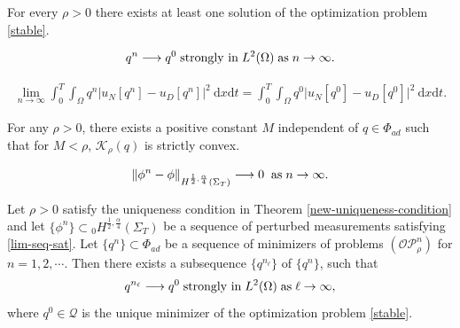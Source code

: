 \documentclass[10pt,a4paper]{amsart}
\newcommand{\dt} {\displaystyle\mathrm{d}t}
\newcommand{\dx} {\displaystyle\mathrm{d}x}
\begin{document}
\begin{theorem}[Existence]\label{theorem-existence}
For every $\rho>0$ there exists at least one solution of the optimization
problem \eqref{stable}.
\end{theorem}

\begin{equation}\label{cv-0}
q^n\longrightarrow q^0\; \hbox{strongly in}\; L^2(\Omega)\; \hbox{as}\; n\rightarrow\infty.
\end{equation}

\begin{align} \label{c2}
    \lim_{n\rightarrow\infty} \int_0^T \int_{\Omega}q^n\Big|
 u_N[q^n]- u_D[q^n]\Big|^2\ \dx \dt = \int_0^T \int_{\Omega}q^0\Big|
 u_N[q^0]- u_D[q^0]\Big|^2\ \dx \dt.
\end{align}

\begin{theorem}[Uniqueness]\label{new-uniqueness-condition}
    For any $\rho>0$, there exists a positive constant $M$ independent of $q\in\Phi_{ad}$ such that for $M<\rho$, $\mathcal{K}_\rho(q)$ is strictly convex.
\end{theorem}

\begin{align}\label{lim-seq-sat}
    \|\phi^n - \phi\|_{H^{\frac{1}{2},\frac{\alpha}{4} }\left(\Sigma_{T}\right)} \longrightarrow 0\;\; \hbox{as}\; n\rightarrow\infty.
\end{align}

\begin{theorem} Let $\rho>0$ satisfy the uniqueness condition in Theorem \ref{new-uniqueness-condition} and let $\{\phi^n\} \subset {}_0H^{\frac{1}{2},\frac{\alpha}{4}}(\Sigma_T)$ be a sequence of perturbed measurements satisfying \eqref{lim-seq-sat}. Let $\{ q^n \}\subset\Phi_{ad}$ be a sequence of minimizers of problems $(\mathcal{O}\mathcal{P}_{\rho}^n)$ for $n=1,2,\cdots$. Then there exists a subsequence $\{ q^{n_\ell} \}$ of $\{ q^n \}$, such that 
\begin{equation*}
q^{n_\ell}\longrightarrow q^0\; \hbox{strongly in}\; L^2(\Omega)\; \hbox{as}\; \ell\rightarrow\infty,
\end{equation*}
where $q^0\in\mathcal{Q}$ is the unique minimizer of the optimization problem \eqref{stable}.
\end{theorem}
\end{document}

